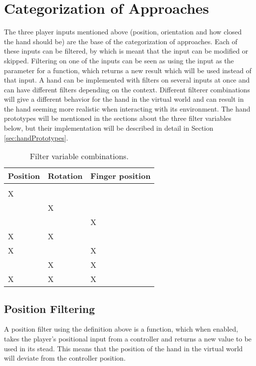 \section{Categorization of Approaches}
\label{sec:categorizationOfApproaches}
The three player inputs mentioned above (position, orientation and how closed the hand should be) are the base of the categorization of approaches. Each of these inputs can be filtered, by which is meant that the input can be modified or skipped. Filtering on one of the inputs can be seen as using the input as the parameter for a function, which returns a new result which will be used instead of that input. A hand can be implemented with filters on several inputs at once and can have different filters depending on the context. Different filterer combinations will give a different behavior for the hand in the virtual world and can result in the hand seeming more realistic when interacting with its environment. The hand prototypes will be mentioned in the sections about the three filter variables below, but their implementation will be described in detail in Section \ref{sec:handPrototypes}.

\begin{table}[H]
\centering
\caption{Filter variable combinations.}
\label{tab:filterVariableCombinations}
\begin{tabular}{C{2cm}C{2cm}C{2cm}}
Position & Rotation & Finger position \\ \midrule \midrule
				&					&					\\ \midrule
\Large X	&					&					\\ \midrule
				& \Large X	& 		                \\ \midrule
				&					& \Large X     \\ \midrule
\Large X	& \Large X	&					\\ \midrule
\Large X 	&					& \Large X	\\ \midrule
				& \Large X	& \Large X	\\ \midrule
\Large X 	& \Large X 	& \Large X
\end{tabular}
\end{table}

\subsection{Position Filtering}
\label{subsec:categoryPositionFiltering}
A position filter using the definition above is a function, which when enabled, takes the player's positional input from a controller and returns a new value to be used in its stead. This means that the position of the hand in the virtual world will deviate from the controller position.\\

